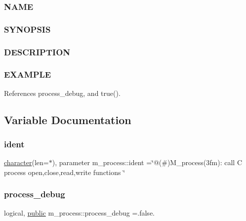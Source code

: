 \subsubsection*{N\+A\+ME}

\subsubsection*{S\+Y\+N\+O\+P\+S\+IS}

\subsubsection*{D\+E\+S\+C\+R\+I\+P\+T\+I\+ON}

\subsubsection*{E\+X\+A\+M\+P\+LE}

References process\+\_\+debug, and true().



\subsection{Variable Documentation}
\mbox{\label{namespacem__process_ac360b3ab77dd978287edf0a0773922de}} 
\subsubsection{\texorpdfstring{ident}{ident}}
{\footnotesize\ttfamily \hyperlink{option__stopwatch_83_8txt_abd4b21fbbd175834027b5224bfe97e66}{character}(len=$\ast$), parameter m\+\_\+process\+::ident =\char`\"{}@(\#)M\+\_\+process(3fm)\+: call C process open,close,read,write functions \char`\"{}}

\mbox{\label{namespacem__process_a0fabee8d01338d5523fbdea5c5f1e894}} 
\subsubsection{\texorpdfstring{process\+\_\+debug}{process\_debug}}
{\footnotesize\ttfamily logical, \hyperlink{M__stopwatch_83_8txt_a2f74811300c361e53b430611a7d1769f}{public} m\+\_\+process\+::process\+\_\+debug =.false.}


